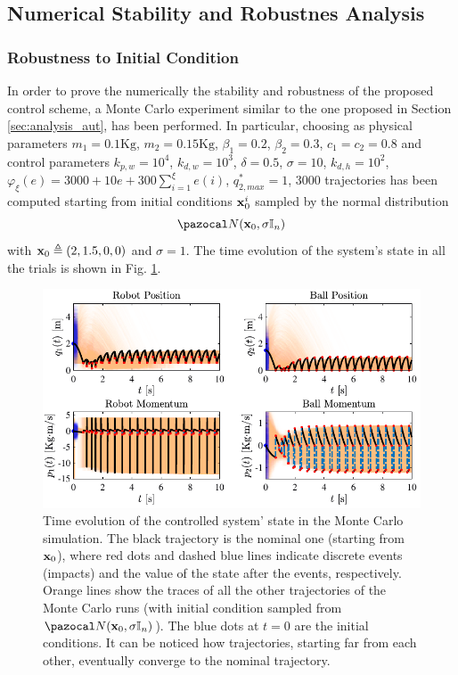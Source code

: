 \subsection{Numerical Stability and Robustnes Analysis}
%
\subsubsection{Robustness to Initial Condition}
In order to prove the numerically the stability and robustness of the proposed control scheme, a Monte Carlo experiment similar to the one proposed in Section \ref{sec:analysis_aut}, has been performed. In particular, choosing as physical parameters $m_1=0.1\text{Kg}$, $m_2=0.15\text{Kg}$, $\beta_1=0.2$, $\beta_2=0.3$, $c_1=c_2=0.8$ and control parameters $k_{p,w} = 10^4$, $k_{d,w} = 10^3$, $\delta = 0.5$, $\sigma = 10$, $k_{d,h} = 10^2$, $\varphi_\xi(e) = 3000 + 10e + 300\sum_{i = 1}^{\xi}e(i)$, $q_{2,max}^* = 1$, 3000 trajectories has been computed starting from initial conditions $\mathbf{x}_0^i$ sampled by the normal distribution
%
\begin{equation}
    \N(\xb_0,\sigma\mathbb{I}_n)
\end{equation}
%
with $\mathbf{x}_0\triangleq(2,1.5,0,0)$ and $\sigma=1$. The time evolution of the system's state in all the trials is shown in Fig. \ref{fig:reg1}.
%
\begin{figure}[!ht]
    \centering
    \includegraphics[width = \linewidth]{Figures/reg1.pdf}
    \caption[Time evolution of the controlled system' state in the Monte Carlo simulation]{Time evolution of the controlled system' state in the Monte Carlo simulation. The black trajectory is the nominal one (starting from $\mathbf{x}_0$), where red dots and dashed blue lines indicate discrete events (impacts) and the value of the state after the events, respectively. Orange lines show the traces of all the other trajectories of the Monte Carlo runs (with initial condition sampled from $\N(\xb_0,\sigma\mathbb{I}_n)$). The blue dots at $t=0$ are the initial conditions. It can be noticed how trajectories, starting far from each other, eventually converge to the nominal trajectory.}
    \label{fig:reg1}
\end{figure}
